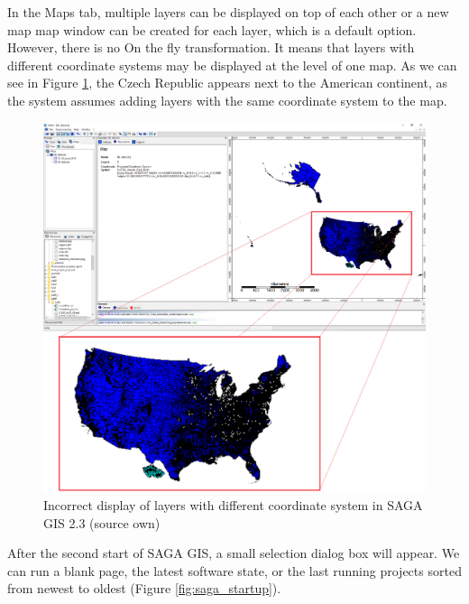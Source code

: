 \documentclass[a4paper,10pt,twoside]{article}
\begin{document}
In the Maps tab, multiple layers can be displayed on top of each other or a new map map window can be created for each layer, which is a default option. However, there is no On the fly transformation. It means that layers with different coordinate systems may be displayed at the level of one map.  As we can see in Figure \ref{fig:saga_gis_cele}, the Czech Republic appears next to the American continent, as the system assumes adding layers with the same coordinate system to the map.

\begin{figure}[hbt!] 
\begin{center}
\includegraphics[width=15cm]{../pictures/saga_gis_cele.png} 
\caption[Incorrect display of layers with different coordinate system in SAGA GIS 2.3 (source own)]{Incorrect display of layers with different coordinate system in SAGA GIS 2.3 (source own)}
\label{fig:saga_gis_cele}
\end{center}
\end{figure}

\noindent After the second start of SAGA GIS, a small selection dialog box will appear. We can run a blank page, the latest software state, or the last running projects sorted from newest to oldest (Figure \ref{fig:saga_startup}).
\end{document}
